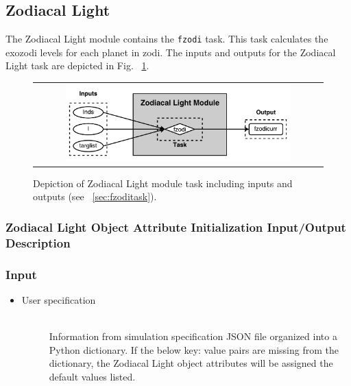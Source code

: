 \documentclass[cleanfoot]{asme2ej}
\begin{document}

\subsection{Zodiacal Light}\label{sec:zodiacallight}

The Zodiacal Light module contains the \verb+fzodi+ task.  This task calculates the exozodi levels for each planet in zodi.  The inputs and outputs for the Zodiacal Light task are depicted in Fig. ~\ref{fig:zodiacallightmodule}.

\begin{figure}[ht]
    \begin{center}
        \begin{tabular}{c}
             \includegraphics[width=0.8\textwidth]{ZodiTasks}
        \end{tabular}
    \end{center}
    \caption{\label{fig:zodiacallightmodule} Depiction of Zodiacal Light module task including inputs and outputs (see ~\ref{sec:fzoditask}).}
\end{figure}

\subsubsection{Zodiacal Light Object Attribute Initialization Input/Output Description}
\subsubsection*{Input}
\begin{itemize}
    \item
    \begin{description}
        \item[User specification] \hfill \\
        Information from simulation specification JSON file organized into a Python dictionary. If the below key: value pairs are missing from the dictionary, the Zodiacal Light object attributes will be assigned the default values listed.
    \end{description}
\end{itemize}
\end{document}
